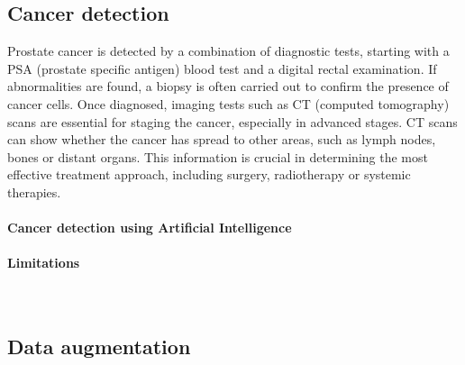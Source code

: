 \newpage
\subsection{Cancer detection}
Prostate cancer is detected by a combination of diagnostic tests, starting with a PSA (prostate specific antigen) blood test and a digital rectal examination. If abnormalities are found, a biopsy is often carried out to confirm the presence of cancer cells. Once diagnosed, imaging tests such as CT (computed tomography) scans are essential for staging the cancer, especially in advanced stages. CT scans can show whether the cancer has spread to other areas, such as lymph nodes, bones or distant organs. This information is crucial in determining the most effective treatment approach, including surgery, radiotherapy or systemic therapies.
\paragraph{Cancer detection using Artificial Intelligence}
\paragraph{Limitations}\mbox{}\\

\newpage
\subsection{Data augmentation}
